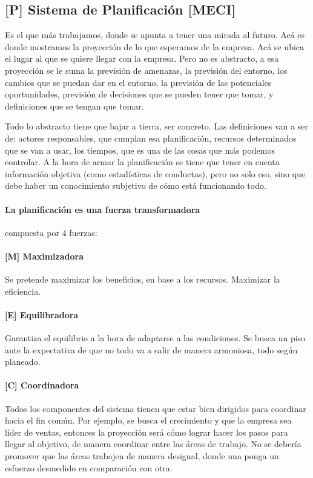 \hypertarget{sistema-de-planificaciuxf3n-meci}{%
\subsection{{[}P{]} Sistema de Planificación
{[}MECI{]}}\label{sistema-de-planificaciuxf3n-meci}}

Es el que más trabajamos, donde se apunta a tener una mirada al futuro.
Acá es donde mostramos la proyección de lo que esperamos de la empresa.
Acá se ubica el lugar al que se quiere llegar con la empresa. Pero no es
abstracto, a esa proyección se le suma la previsión de amenazas, la
previsión del entorno, los cambios que se puedan dar en el entorno, la
previsión de las potenciales oportunidades, previsión de decisiones que
se pueden tener que tomar, y definiciones que se tengan que tomar.

Todo lo abstracto tiene que bajar a tierra, ser concreto. Las
definiciones van a ser de: actores responsables, que cumplan esa
planificación, recursos determinados que se van a usar, los tiempos, que
es una de las cosas que más podemos controlar.
%
A la hora de armar la planificación se tiene que tener en cuenta
información objetiva (como estadísticas de conductas), pero no solo eso,
sino que debe haber un conocimiento subjetivo de cómo está funcionando
todo.
%
\paragraph{La planificación es una fuerza transformadora}
compuesta por 4 fuerzas:

\hypertarget{maximizadora}{%
\paragraph{{[}M{]} Maximizadora}\label{maximizadora}}
Se pretende maximizar los beneficios, en base a
los recursos. Maximizar la eficiencia. 

\hypertarget{equilibradora}{%
\paragraph{{[}E{]} Equilibradora}\label{equilibradora}}
Garantiza el equilibrio a la hora de adaptarse a las condiciones. Se
busca un piso ante la expectativa de que no todo va a salir de manera
armoniosa, todo según planeado. 

\hypertarget{coordinadora}{%
\paragraph{{[}C{]} Coordinadora}\label{coordinadora}}
Todos los
componentes del sistema tienen que estar bien dirigidos para coordinar
hacia el fin común. Por ejemplo, se busca el crecimiento y que la
empresa sea líder de ventas, entonces la proyección será cómo lograr
hacer los pasos para llegar al objetivo, de manera coordinar entre las
áreas de trabajo. No se debería promover que las áreas trabajen de
manera desigual, donde una ponga un esfuerzo desmedido en comparación
con otra.

